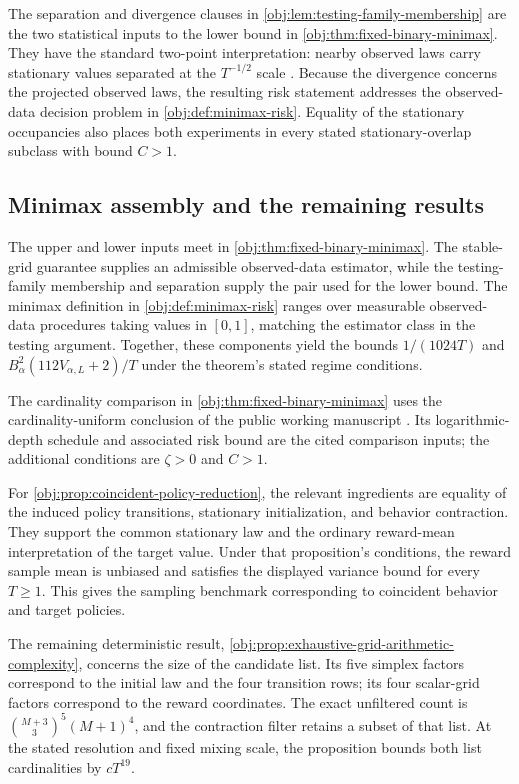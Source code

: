 The separation and divergence clauses in \cref{obj:lem:testing-family-membership} are the two statistical inputs to the lower bound in \cref{obj:thm:fixed-binary-minimax}. They have the standard two-point interpretation: nearby observed laws carry stationary values separated at the \(T^{-1/2}\) scale \citep[Section 2.2]{Tsybakov2009}. Because the divergence concerns the projected observed laws, the resulting risk statement addresses the observed-data decision problem in \cref{obj:def:minimax-risk}. Equality of the stationary occupancies also places both experiments in every stated stationary-overlap subclass with bound \(C>1\).

\subsection{Minimax assembly and the remaining results}

The upper and lower inputs meet in \cref{obj:thm:fixed-binary-minimax}. The stable-grid guarantee supplies an admissible observed-data estimator, while the testing-family membership and separation supply the pair used for the lower bound. The minimax definition in \cref{obj:def:minimax-risk} ranges over measurable observed-data procedures taking values in \([0,1]\), matching the estimator class in the testing argument. Together, these components yield the bounds \(1/(1024T)\) and \(B_\alpha^2(112V_{\alpha,L}+2)/T\) under the theorem's stated regime conditions.

The cardinality comparison in \cref{obj:thm:fixed-binary-minimax} uses the cardinality-uniform conclusion of the public working manuscript \citet[Theorem 1 (Uniform overlap frontier) and the Signed-depth family definition]{CausalSmithLatentOverlap2026}. Its logarithmic-depth schedule and associated risk bound are the cited comparison inputs; the additional conditions are \(\zeta>0\) and \(C>1\).

For \cref{obj:prop:coincident-policy-reduction}, the relevant ingredients are equality of the induced policy transitions, stationary initialization, and behavior contraction. They support the common stationary law and the ordinary reward-mean interpretation of the target value. Under that proposition's conditions, the reward sample mean is unbiased and satisfies the displayed variance bound for every \(T\geq1\). This gives the sampling benchmark corresponding to coincident behavior and target policies.

The remaining deterministic result, \cref{obj:prop:exhaustive-grid-arithmetic-complexity}, concerns the size of the candidate list. Its five simplex factors correspond to the initial law and the four transition rows; its four scalar-grid factors correspond to the reward coordinates. The exact unfiltered count is \(\binom{M+3}{3}^{5}(M+1)^4\), and the contraction filter retains a subset of that list. At the stated resolution and fixed mixing scale, the proposition bounds both list cardinalities by \(cT^{19}\).

